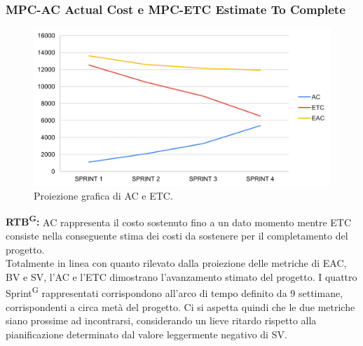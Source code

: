 \documentclass[8pt]{article}
\newcommand{\glossterm}[1]{#1\textsuperscript{G}} %
\begin{document}
\subsubsection{MPC-AC Actual Cost e MPC-ETC Estimate To Complete}
\begin{figure}[h!]
    \centering
    \includegraphics[width=1\textwidth]{images/ETC_AC.png}
    \caption{Proiezione grafica di AC e ETC.}
    \label{fig:Proiezione grafica di AC e ETC}
\end{figure}
\textbf{\glossterm{RTB}:} AC rappresenta il costo sostenuto fino a un dato momento mentre ETC consiste nella conseguente stima dei costi da sostenere per il completamento del progetto.\\
Totalmente in linea con quanto rilevato dalla proiezione delle metriche di EAC, BV e SV, l'AC e l'ETC dimostrano l'avanzamento stimato del progetto. I quattro \glossterm{Sprint} rappresentati corrispondono all'arco di tempo definito da 9 settimane, corrispondenti a circa metà del progetto. Ci si aspetta quindi che le due metriche siano prossime ad incontrarsi, considerando un lieve ritardo rispetto alla pianificazione determinato dal valore leggermente negativo di SV.
\clearpage
\end{document}
